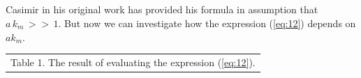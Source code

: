 \documentclass[twoside, 10pt, ptm]{article}
\begin{document}
\begin{multicols}{2}


    \section*{}\label{how-deltaleftevright-depends-on-a-k_m}
\vspace{-3.5mm}


    Casimir in his original work \cite{Casimir1948} has provided his formula in assumption that
\(a\,k_m\,>>\,1\). But now we can investigate how the expression (\ref{eq:12}) depends on \(a k_m\).


\noindent
\begin{center}
\begin{tabular}{ r }
Table 1. The result of evaluating the expression (\ref{eq:12}).
\end{tabular}


\end{center}
\end{multicols}
\end{document}

